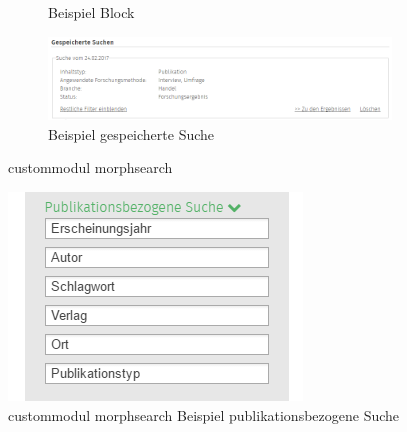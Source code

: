 \begin{figure}[H]
\begin{subfigure}[b]{0.23\textwidth}
		\caption[]{Beispiel Block}
		\label{fig:example_morphsearchblock}
	\end{subfigure}
	\begin{subfigure}[b]{0.50\textwidth}
		\centering
		\includegraphics[width=0.95\linewidth]{images/example_morphsearch_savedsearch}
		\caption[]{Beispiel gespeicherte Suche}
		\label{fig:example_morphsearch_savedsearch}
	\end{subfigure}
	\caption{\gls{custommodul} morphsearch}
	\label{fig:morphsearch}
\end{figure}

\vspace{-1em}
\begin{figure}[H]
	\centering
	\includegraphics[height=0.10\textheight]{images/example_morphsearch_publication}
	\caption{\gls{custommodul} morphsearch Beispiel publikationsbezogene Suche}
	\label{fig:example_morphsearch_publication}
\end{figure}

